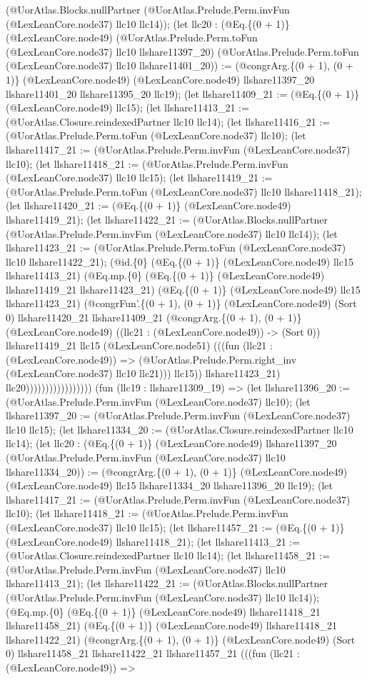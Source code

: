 \documentclass[11pt]{article}
\begin{document}
(@UorAtlas.Blocks.nullPartner (@UorAtlas.Prelude.Perm.invFun (@LexLeanCore.node37) llc10 llc14)); (let llc20 : (@Eq.\{(0 + 1)\} (@LexLeanCore.node49) (@UorAtlas.Prelude.Perm.toFun (@LexLeanCore.node37) llc10 llshare11397\_20) (@UorAtlas.Prelude.Perm.toFun (@LexLeanCore.node37) llc10 llshare11401\_20)) := (@congrArg.\{(0 + 1), (0 + 1)\} (@LexLeanCore.node49) (@LexLeanCore.node49) llshare11397\_20 llshare11401\_20 llshare11395\_20 llc19); (let llshare11409\_21 := (@Eq.\{(0 + 1)\} (@LexLeanCore.node49) llc15); (let llshare11413\_21 := (@UorAtlas.Closure.reindexedPartner llc10 llc14); (let llshare11416\_21 := (@UorAtlas.Prelude.Perm.toFun (@LexLeanCore.node37) llc10); (let llshare11417\_21 := (@UorAtlas.Prelude.Perm.invFun (@LexLeanCore.node37) llc10); (let llshare11418\_21 := (@UorAtlas.Prelude.Perm.invFun (@LexLeanCore.node37) llc10 llc15); (let llshare11419\_21 := (@UorAtlas.Prelude.Perm.toFun (@LexLeanCore.node37) llc10 llshare11418\_21); (let llshare11420\_21 := (@Eq.\{(0 + 1)\} (@LexLeanCore.node49) llshare11419\_21); (let llshare11422\_21 := (@UorAtlas.Blocks.nullPartner (@UorAtlas.Prelude.Perm.invFun (@LexLeanCore.node37) llc10 llc14)); (let llshare11423\_21 := (@UorAtlas.Prelude.Perm.toFun (@LexLeanCore.node37) llc10 llshare11422\_21); (@id.\{0\} (@Eq.\{(0 + 1)\} (@LexLeanCore.node49) llc15 llshare11413\_21) (@Eq.mp.\{0\} (@Eq.\{(0 + 1)\} (@LexLeanCore.node49) llshare11419\_21 llshare11423\_21) (@Eq.\{(0 + 1)\} (@LexLeanCore.node49) llc15 llshare11423\_21) (@congrFun'.\{(0 + 1), (0 + 1)\} (@LexLeanCore.node49) (Sort 0) llshare11420\_21 llshare11409\_21 (@congrArg.\{(0 + 1), (0 + 1)\} (@LexLeanCore.node49) ((llc21 : (@LexLeanCore.node49)) -> (Sort 0)) llshare11419\_21 llc15 (@LexLeanCore.node51) (((fun (llc21 : (@LexLeanCore.node49)) => (@UorAtlas.Prelude.Perm.right\_inv (@LexLeanCore.node37) llc10 llc21))) llc15)) llshare11423\_21) llc20))))))))))))))))) (fun (llc19 : llshare11309\_19) => (let llshare11396\_20 := (@UorAtlas.Prelude.Perm.invFun (@LexLeanCore.node37) llc10); (let llshare11397\_20 := (@UorAtlas.Prelude.Perm.invFun (@LexLeanCore.node37) llc10 llc15); (let llshare11334\_20 := (@UorAtlas.Closure.reindexedPartner llc10 llc14); (let llc20 : (@Eq.\{(0 + 1)\} (@LexLeanCore.node49) llshare11397\_20 (@UorAtlas.Prelude.Perm.invFun (@LexLeanCore.node37) llc10 llshare11334\_20)) := (@congrArg.\{(0 + 1), (0 + 1)\} (@LexLeanCore.node49) (@LexLeanCore.node49) llc15 llshare11334\_20 llshare11396\_20 llc19); (let llshare11417\_21 := (@UorAtlas.Prelude.Perm.invFun (@LexLeanCore.node37) llc10); (let llshare11418\_21 := (@UorAtlas.Prelude.Perm.invFun (@LexLeanCore.node37) llc10 llc15); (let llshare11457\_21 := (@Eq.\{(0 + 1)\} (@LexLeanCore.node49) llshare11418\_21); (let llshare11413\_21 := (@UorAtlas.Closure.reindexedPartner llc10 llc14); (let llshare11458\_21 := (@UorAtlas.Prelude.Perm.invFun (@LexLeanCore.node37) llc10 llshare11413\_21); (let llshare11422\_21 := (@UorAtlas.Blocks.nullPartner (@UorAtlas.Prelude.Perm.invFun (@LexLeanCore.node37) llc10 llc14)); (@Eq.mp.\{0\} (@Eq.\{(0 + 1)\} (@LexLeanCore.node49) llshare11418\_21 llshare11458\_21) (@Eq.\{(0 + 1)\} (@LexLeanCore.node49) llshare11418\_21 llshare11422\_21) (@congrArg.\{(0 + 1), (0 + 1)\} (@LexLeanCore.node49) (Sort 0) llshare11458\_21 llshare11422\_21 llshare11457\_21 (((fun (llc21 : (@LexLeanCore.node49)) => 
\end{document}
